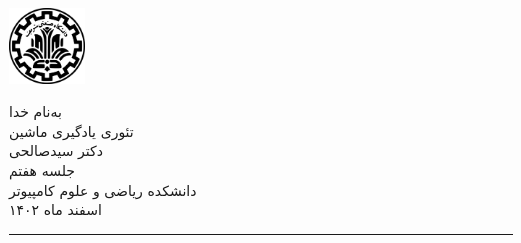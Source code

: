 \begin{minipage}{0.1\textwidth}
\includegraphics[width=2cm]{etc/sut}
\end{minipage}%
\hspace{1.65cm}
\begin{minipage}{0.5\textwidth}\centering
\fontsize{10pt}{10pt}\selectfont
به‌نام خدا \\
تئوری یادگیری ماشین \\
دکتر سیدصالحی \\
جلسه هفتم \\
\vspace{0.25cm}
\begingroup
\fontsize{8pt}{8pt}\selectfont
دانشکده ریاضی و علوم کامپیوتر \\
اسفند ماه ۱۴۰۲ \\
\endgroup
\end{minipage}%
\hfill%
\begin{minipage}{0.1\textwidth}
\end{minipage}

\vspace{0.5cm}

\noindent\rule{\textwidth}{1pt}
